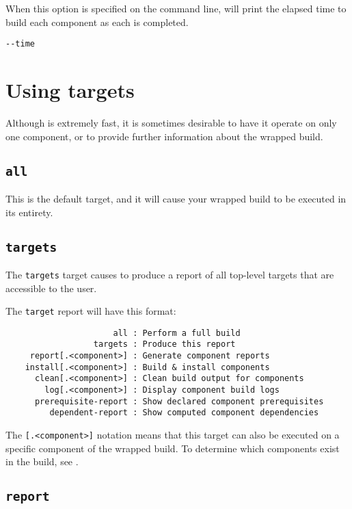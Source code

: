 When this option is specified on the command line, \lmsbw will print
the elapsed time to build each component as each is completed.

\begin{verbatim}
--time
\end{verbatim}


\section{Using \lmsbw \make targets}

Although \lmsbw is extremely fast, it is sometimes desirable to have
it operate on only one component, or to provide further information
about the wrapped build.

\subsection{\texttt{all}}\label{lmsbw:target:all}

This is the default target, and it will cause your wrapped build to be
executed in its entirety.

\subsection{\texttt{targets}}

The \texttt{targets} target causes \lmsbw to produce a report of all
top-level targets that are accessible to the user.

The \texttt{target} report will have this format:

\begin{verbatim}
                      all : Perform a full build
                  targets : Produce this report
     report[.<component>] : Generate component reports
    install[.<component>] : Build & install components
      clean[.<component>] : Clean build output for components
        log[.<component>] : Display component build logs
      prerequisite-report : Show declared component prerequisites
         dependent-report : Show computed component dependencies
\end{verbatim}

The \texttt{[.<component>]} notation means that this target can also
be executed on a specific component of the wrapped build.  To
determine which components exist in the build, see
.

\subsection{\texttt{report}}

